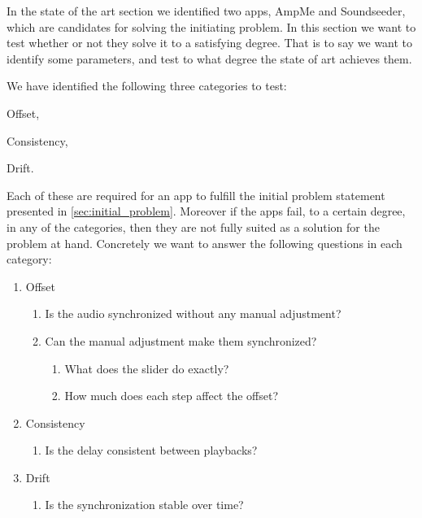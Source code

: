 In the state of the art section we identified two apps, AmpMe and Soundseeder, which are candidates for solving the initiating problem. 
In this section we want to test whether or not they solve it to a satisfying degree. 
That is to say we want to identify some parameters, and test to what degree the state of art achieves them.

We have identified the following three categories to test:
\begin{enumerate*}[label=(\alph*)]
    \item Offset,
    \item Consistency,
    \item Drift.
\end{enumerate*}

Each of these are required for an app to fulfill the initial problem statement presented in \vref{sec:initial_problem}.
Moreover if the apps fail, to a certain degree, in any of the categories, then they are not fully suited as a solution for the problem at hand. 
Concretely we want to answer the following questions in each category:
\begin{enumerate}[label=(\alph*)]
    \item Offset
    \begin{enumerate}[label=(\arabic*)]
        \item Is the audio synchronized without any manual adjustment?
        \item Can the manual adjustment make them synchronized?
        \begin{enumerate}
            \item What does the slider do exactly?
            \item How much does each step affect the offset?
        \end{enumerate}
    \end{enumerate} 
    \item Consistency
    \begin{enumerate}[start=3,label=(\arabic*)]
        \item Is the delay consistent between playbacks?
    \end{enumerate}
    \item Drift
    \begin{enumerate}[start=6,label=(\arabic*)]
        \item Is the synchronization stable over time?
    \end{enumerate}
\end{enumerate}
